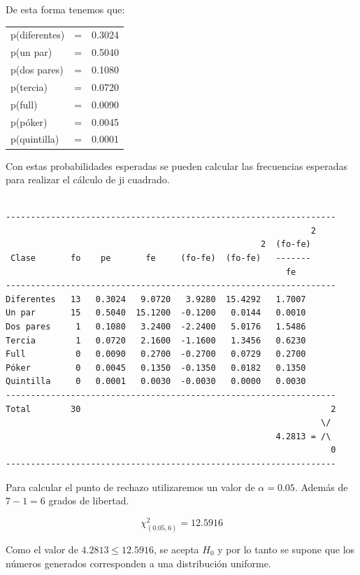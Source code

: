 De esta forma tenemos que:

\begin{center}
    \begin{tabular}{lrl}
       p(diferentes)&=&0.3024 \\
p(un par)    &=&0.5040\\
p(dos pares) &=&0.1080\\
p(tercia)    &=&0.0720\\
p(full)      &=&0.0090\\
p(póker)     &=&0.0045\\
p(quintilla) &=&0.0001
    \end{tabular}
\end{center}

Con estas probabilidades esperadas se pueden calcular las frecuencias esperadas para realizar el cálculo de ji cuadrado.

\begin{verbatim}

------------------------------------------------------------------
                                                             2
                                                   2  (fo-fe)
 Clase       fo    pe       fe     (fo-fe)  (fo-fe)   -------
                                                        fe
------------------------------------------------------------------
Diferentes   13   0.3024   9.0720   3.9280  15.4292   1.7007
Un par       15   0.5040  15.1200  -0.1200   0.0144   0.0010
Dos pares     1   0.1080   3.2400  -2.2400   5.0176   1.5486
Tercia        1   0.0720   2.1600  -1.1600   1.3456   0.6230
Full          0   0.0090   0.2700  -0.2700   0.0729   0.2700
Póker         0   0.0045   0.1350  -0.1350   0.0182   0.1350
Quintilla     0   0.0001   0.0030  -0.0030   0.0000   0.0030
------------------------------------------------------------------
Total        30                                                  2
                                                               \/
                                                      4.2813 = /\
                                                                 0
------------------------------------------------------------------

\end{verbatim}

Para calcular el punto de rechazo utilizaremos un valor de $\alpha = 0.05$. Además de $7-1 = 6$ grados de libertad.


$$\chi^2_{(0.05,6)} = 12.5916$$

Como el valor de $4.2813 \leq 12.5916$, se acepta $H_0$ y por lo tanto se supone que los números generados corresponden a una distribución uniforme.




